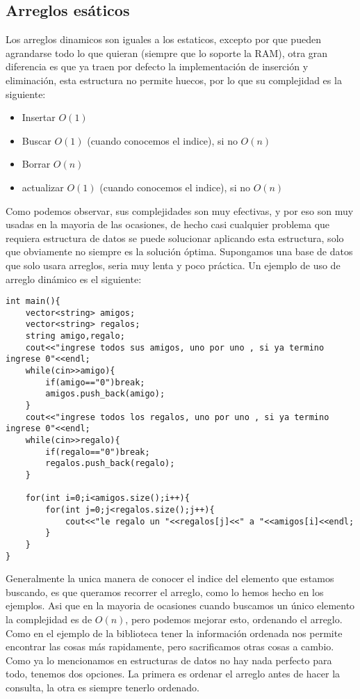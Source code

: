 \subsection{Arreglos esáticos}
Los arreglos dinamicos son iguales a los estaticos, excepto por que pueden agrandarse todo lo que quieran (siempre que lo soporte la RAM), otra gran diferencia es que ya traen por defecto la implementación de inserción y eliminación, esta estructura no permite huecos, por lo que su complejidad es la siguiente:
\begin{itemize}
    \item Insertar $O(1)$
    \item Buscar   $O(1)$ (cuando conocemos el indice), si no $O(n)$
    \item Borrar   $O(n)$
    \item actualizar $O(1)$ (cuando conocemos el indice), si no $O(n)$
\end{itemize}
Como podemos observar, sus complejidades son muy efectivas, y por eso son muy usadas en la mayoria de las ocasiones, de hecho casi cualquier problema que requiera estructura de datos se puede solucionar aplicando esta estructura, solo que obviamente no siempre es la solución óptima. Supongamos una base de datos que solo usara arreglos, seria muy lenta y poco práctica.
Un ejemplo de uso de arreglo dinámico es el siguiente:
\\\begin{minipage}{\textwidth}
\begin{lstlisting}[style=C,caption=arregloDinamicoAmigos.cpp]
int main(){
    vector<string> amigos;
    vector<string> regalos;
    string amigo,regalo;
    cout<<"ingrese todos sus amigos, uno por uno , si ya termino ingrese 0"<<endl;
    while(cin>>amigo){
        if(amigo=="0")break;
        amigos.push_back(amigo);
    }
    cout<<"ingrese todos los regalos, uno por uno , si ya termino ingrese 0"<<endl;
    while(cin>>regalo){
        if(regalo=="0")break;
        regalos.push_back(regalo);
    }

    for(int i=0;i<amigos.size();i++){
        for(int j=0;j<regalos.size();j++){
            cout<<"le regalo un "<<regalos[j]<<" a "<<amigos[i]<<endl;
        }
    }
}
\end{lstlisting}
\end{minipage}
Generalmente la unica manera de conocer el indice del elemento que estamos buscando, es que queramos recorrer el arreglo, como lo hemos hecho en los ejemplos. Asi que en la mayoria de ocasiones cuando buscamos un único elemento la complejidad es de $O(n)$, pero podemos mejorar esto, ordenando el arreglo. Como en el ejemplo de la biblioteca tener la información ordenada nos permite encontrar las cosas más rapidamente, pero sacrificamos otras cosas a cambio. Como ya lo mencionamos en estructuras de datos no hay nada perfecto para todo, tenemos dos opciones. La primera es ordenar el arreglo antes de hacer la consulta, la otra es siempre tenerlo ordenado.
